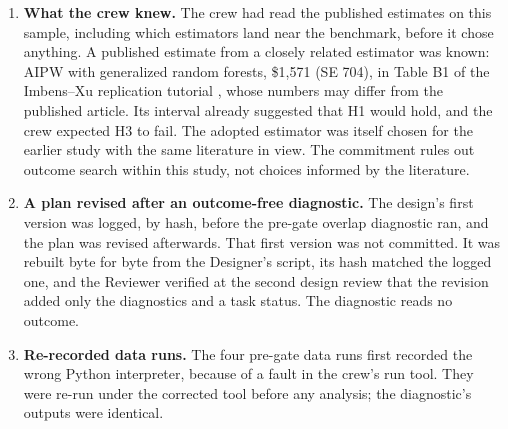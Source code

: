 \documentclass[11pt]{article}
\begin{document}
\begin{enumerate}
        as carrying no information instead of naming black (Section~\ref{sec:sensitivity}).
        This departs from the sensitivity reading rule, one of the decision rules fixed before
        any outcome was read (Section~\ref{sec:rules}).
        (b)~The H1 decision is qualified as lying within cross-fitting noise, with the
        per-repetition intervals reported (Table~\ref{tab:reps}); the H1 rule is unchanged.
        (c)~The trigger from control-only trimming is read as consistent with refitting
        noise, not as an overlap failure (Section~\ref{sec:robustness}). What the check
        measures, and the dropped men's $\TrimDroppedWeightShare$\% share of the control
        weight, were fixed in the design; the noise reading is a post-results interpretation
        that lowers the weight given to a check that triggered. Changes (a) and (b) make the
        report more cautious; (c) does the opposite. None of the three alters an estimate or
        the H1, H3 or disagreement rules.
  \item \textbf{What the crew knew.} The crew had read the published estimates on this
        sample, including which estimators land near the benchmark, before it chose anything.
        A published estimate from a closely related estimator was known: AIPW with generalized
        random forests, \$1,571 (SE 704), in Table B1 of the Imbens--Xu replication tutorial
        \citep{xu2024tutorial}, whose numbers may differ from the published article. Its
        interval already suggested that H1 would hold, and the crew expected H3 to fail. The
        adopted estimator was itself chosen for the earlier study with the same literature in
        view. The commitment rules out outcome search within this study, not choices informed
        by the literature.
  \item \textbf{A plan revised after an outcome-free diagnostic.} The design's first version
        was logged, by hash, before the pre-gate overlap diagnostic ran, and the plan was
        revised afterwards. That first version was not committed. It was rebuilt byte for byte
        from the Designer's script, its hash matched the logged one, and the Reviewer verified
        at the second design review that the revision added only the diagnostics and a task
        status. The diagnostic reads no outcome.
  \item \textbf{Re-recorded data runs.} The four pre-gate data runs first recorded the wrong
        Python interpreter, because of a fault in the crew's run tool. They were re-run under
        the corrected tool before any analysis; the diagnostic's outputs were identical.

\end{enumerate}
\end{document}
